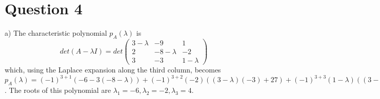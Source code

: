 \documentclass[12pt]{article}
\renewcommand{\=}[1]{\stackrel{#1}{=}} %
\theoremstyle{definition}
\begin{document}
\pagestyle{empty}
\section*{Question 4}\LARGE
a) The characteristic polynomial $p_A(\lambda)$ is $$det(A-\lambda I) = det\begin{pmatrix}
    3 - \lambda & -9 & 1\\
    2 & -8 - \lambda & -2\\
    3 & -3 & 1 - \lambda
\end{pmatrix}$$ which, using the Laplace expansion along the third column, becomes $p_A(\lambda) = (-1)^{3 + 1}(-6 - 3(-8-\lambda)) + (-1)^{3 + 2}(-2)((3-\lambda)(-3) + 27) + (-1)^{3+3}(1-\lambda)((3-\lambda)(-8-\lambda) + 18) = -(\lambda+6)(\lambda+2)(\lambda-4)$. The roots of this polynomial are $\lambda_1 = -6, \lambda_2 = -2, \lambda_3 = 4$.
\end{document}

